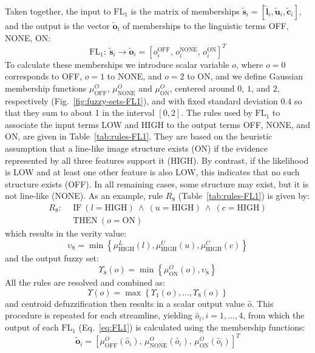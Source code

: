 \documentclass[twocolumn,natbib]{svjour3}
\begin{document}
Taken together, the input to $\textrm{FL}_{1}$ is the matrix of memberships $\tilde{\mathbf{s}}_{i}=[\tilde{\mathbf{l}}_{i},\tilde{\mathbf{u}}_{i},\tilde{\mathbf{c}}_{i}]$, and the output is the vector $\tilde{\mathbf{o}}_{i}$ of memberships to the linguistic terms OFF, NONE, ON:
\begin{equation}
\mathrm{FL}_{1}\!:\ \tilde{\mathbf{s}}_{i} \rightarrow \tilde{\mathbf{o}}_{i} = \left[o_{i}^{\textrm{OFF}}\!,\, o_{i}^{\textrm{NONE}}\!,\, o_{i}^{\textrm{ON}}\right]^T
\label{eq:FL1}
\end{equation}
To calculate these memberships we introduce scalar variable $o$, where $o=0$ corresponds to OFF, $o=1$ to NONE, and $o=2$ to ON, and we define Gaussian membership functions $\mu_{\textrm{OFF}}^{O}$, $\mu_{\textrm{NONE}}^{O}$ and $\mu_{\textrm{ON}}^{O}$, centered around $0$, $1$, and $2$, respectively (Fig.~\ref{fig:fuzzy-sets-FL1}), and with fixed standard deviation $0.4$ so that they sum to about 1 in the interval $[0,2]$. The rules used by $\textrm{FL}_{1}$ to associate the input terms LOW and HIGH to the output terms OFF, NONE, and ON, are given in Table~\ref{tab:rules-FL1}. They are based on the heuristic assumption that a line-like image structure exists (ON) if the evidence represented by all three features support it (HIGH). By contrast, if the likelihood is LOW and at least one other feature is also LOW, this indicates that no such structure exists (OFF). In all remaining cases, some structure may exist, but it is not line-like (NONE). As an example, rule $R_8$ (Table~\ref{tab:rules-FL1}) is given by:
\begin{equation}
\begin{split}
R_8\!:\ \ & \textrm{IF}\ (l=\textrm{HIGH})\ \wedge\ (u=\textrm{HIGH})\ \wedge\ (c=\textrm{HIGH}) \\
& \textrm{THEN}\ (o = \textrm{ON})
\end{split}
\end{equation}
which results in the verity value:
\begin{equation}
\upsilon_{8} = \min\left\{\mu_{\textrm{HIGH}}^{L}(l), \mu_{\textrm{HIGH}}^{U}(u), \mu_{\textrm{HIGH}}^{C}(c)\right\}
\end{equation}
and the output fuzzy set: 
\begin{equation}
\Upsilon_{8}(o) = \min\left\{\mu_{\textrm{ON}}^{O}(o),\upsilon_{8}\right\}
\end{equation}
All the rules are resolved and combined as:
\begin{equation}
\Upsilon(o) = \max\left\{\Upsilon_{1}(o),\dots,\Upsilon_{8}(o)\right\}
\end{equation}
and centroid defuzzification then results in a scalar output value $\hat{o}$. This procedure is repeated for each streamline, yielding $\hat{o}_{i}, i=1,\dots,4$, from which the output of each $\mathrm{FL}_{1}$ (Eq.~\ref{eq:FL1}) is calculated using the membership functions:
\begin{equation}
\tilde{\mathbf{o}}_{i} = \left[\mu_{\textrm{OFF}}^{O}(\hat{o}_{i}),\, \mu_{\textrm{NONE}}^{O}(\hat{o}_{i}),\, \mu_{\textrm{ON}}^{O}(\hat{o}_{i})\right]^{T}
\end{equation}
\end{document}
